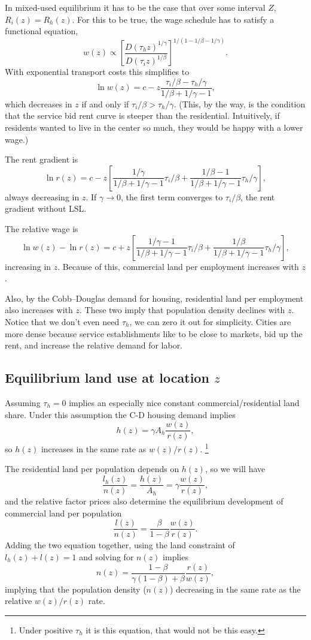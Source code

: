 \documentclass[10pt]{article}
\begin{document}
In mixed-used equilibrium it has to be the case that over some interval $Z$, $R_i(z)=R_h(z)$. For this to be true, the wage schedule has to satisfy a functional equation,
\[
w(z) \propto \left[\frac{D(\tau_hz)^{1/\gamma}}{D(\tau_iz)^{1/\beta}}\right]^{1/(1-1/\beta-1/\gamma)}.
\]
With exponential transport costs this simplifies to
\[
\ln w(z) = c - z\frac{\tau_i/\beta-\tau_h/\gamma}{1/\beta+1/\gamma-1},
\]
which decreases in $z$ if and only if $\tau_i/\beta > \tau_h/\gamma$. (This, by the way, is the condition that the service bid rent curve is steeper than the residential. Intuitively, if residents wanted to live in the center so much, they would be happy with a lower wage.)

The rent gradient is
\[
\ln r(z) = c - z\left[\frac{1/\gamma}{1/\beta+1/\gamma-1}\tau_i/\beta+
\frac{1/\beta-1}{1/\beta+1/\gamma-1}\tau_h/\gamma\right],
\]
always decreasing in $z$. If $\gamma\to 0$, the first term converges to $\tau_i/\beta$, the rent gradient without LSL.

The relative wage is
\[
\ln w(z) - \ln r(z) = c + z\left[\frac{1/\gamma-1}{1/\beta+1/\gamma-1}\tau_i/\beta+
\frac{1/\beta}{1/\beta+1/\gamma-1}\tau_h/\gamma\right],
\]
increasing in $z$. Because of this, commercial land per employment increases with $z$.

Also, by the Cobb--Douglas demand for housing, residential land per employment also increases with $z$. These two imply that population density declines with $z$. Notice that we don't even need $\tau_h$, we can zero it out for simplicity. Cities are more dense because service establishments like to be close to markets, bid up the rent, and increase the relative demand for labor.

\subsection{Equilibrium land use at location $z$}
Assuming $\tau_h=0$ implies an especially nice constant commercial/residential land share. Under this assumption the C-D housing demand implies
\begin{equation*}
h(z)=\gamma A_h\frac{w(z)}{r(z)},
\end{equation*}
so $h(z)$ increases in the same rate as $w(z)/r(z)$. \footnote{Under positive $\tau_h$ it is this equation, that would not be this easy.}

The residential land per population depends on $h(z)$, so we will have
\begin{equation*}
\frac{l_h(z)}{n(z)}=\frac{h(z)}{A_h}=\gamma\frac{w(z)}{r(z)},
\end{equation*}
and the relative factor prices also determine the equilibrium development of commercial land per population
\begin{equation*}
\frac{l(z)}{n(z)}=\frac{\beta}{1-\beta}\frac{w(z)}{r(z)}.
\end{equation*}
Adding the two equation together, using the land constraint of $l_h(z)+l(z)=1$ and solving for $n(z)$ implies
\begin{equation}
n(z)=\frac{1-\beta}{\gamma(1-\beta)+\beta}\frac{r(z)}{w(z)},
\end{equation}
implying that the population density ($n(z)$) decreasing in the same rate as the relative $w(z)/r(z)$ rate.
\end{document}

